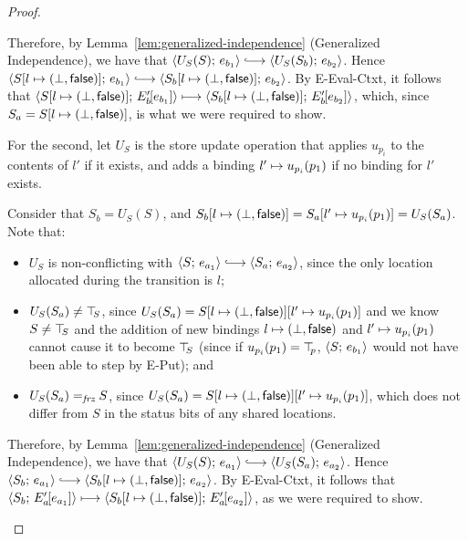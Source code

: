 \begin{proof}
\begin{enumerate}
\begin{enumerate}
      Therefore, by Lemma~\ref{lem:generalized-independence}
      (Generalized Independence), we have that
      $\config{U_S(S)}{e_{b_1}} \parstepsto
      \config{U_S(S_b)}{e_{b_2}}$.  Hence
      $\config{\extS{S}{l}{\bot}{\frozenfalse}}{e_{b_1}} \parstepsto
      \config{\extS{S_b}{l}{\bot}{\frozenfalse}}{e_{b_2}}$.  By {\sc
        E-Eval-Ctxt}, it follows that
      $\langle S[l \mapsto (\bot, \textsf{false})];\, E'_b\hspace{-1mm}\left[e_{b_1}\right] \rangle
      \longmapsto
      \langle S_b[l \mapsto (\bot, \textsf{false})];\, E'_b\hspace{-1mm}\left[e_{b_2}\right] \rangle$,
      which, since $S_a = S[l \mapsto (\bot, \textsf{false})]$, is what we
      were required to show.

      For the second, let $U_S$ is the store update operation that
      applies $u_{p_i}$ to the contents of $l'$ if it exists, and adds
      a binding $l' \mapsto u_{p_i}(p_1)$ if no binding for
      $l'$ exists.

      Consider that $S_b = U_S(S)$, and
      $S_b[l \mapsto (\bot, \textsf{false})] =
      S_a[l' \mapsto u_{p_i}(p_1)] = U_S(S_a)$.  Note that:
      \begin{itemize}
      \item $U_S$ is non-conflicting with $\config{S}{e_{a_1}}
        \parstepsto \config{S_a}{e_{a_2}}$, since the only location
        allocated during the transition is $l$;
      \item $U_S(S_a) \neq \top\hspace{-0.85mm}_{S}$, since $U_S(S_a) =
        S[l \mapsto (\bot, \textsf{false})][l' \mapsto u_{p_i}(p_1)]$
        and we know $S \neq \top\hspace{-0.85mm}_{S}$ and the addition of new bindings
        $l \mapsto (\bot, \textsf{false})$ and
        $l' \mapsto u_{p_i}(p_1)$ cannot cause it to become
        $\top\hspace{-0.85mm}_{S}$ (since if $u_{p_i}(p_1) = \top\hspace{-0.85mm}_{p}$,
        $\langle S;\, e_{b_1} \rangle$ would not have been able to step by {\sc
          E-Put}); and
      \item $U_S(S_a) =_{\textit{frz}} S$, since $U_S(S_a) =
        S[l \mapsto (\bot, \textsf{false})][l' \mapsto u_{p_i}(p_1)]$,
        which does not differ from $S$ in the status bits of any
        shared locations.
      \end{itemize}

      Therefore, by Lemma~\ref{lem:generalized-independence}
      (Generalized Independence), we have that
      $\config{U_S(S)}{e_{a_1}} \parstepsto
      \config{U_S(S_a)}{e_{a_2}}$.  Hence $\config{S_b}{e_{a_1}}
      \parstepsto
      \config{\extS{S_b}{l}{\bot}{\frozenfalse}}{e_{a_2}}$.  By {\sc
        E-Eval-Ctxt}, it follows that
      $\langle S_b;\, E'_a\hspace{-1mm}\left[e_{a_1}\right] \rangle \longmapsto
      \langle S_b[l \mapsto (\bot, \textsf{false})];\, E'_a\hspace{-1mm}\left[e_{a_2}\right] \rangle$,
      as we were required to show.


\end{enumerate}
\end{enumerate}
\end{proof}
